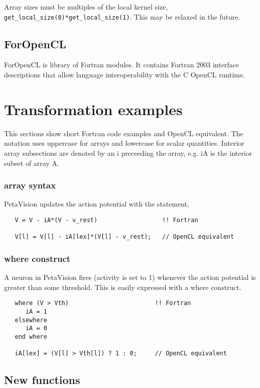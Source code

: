 \documentclass[10pt, conference, compsocconf]{IEEEtran}
\begin{document}
Array sizes must be multiples of the local kernel size,
{\tt get\_local\_size(0)*get\_local\_size(1)}.  This may be relaxed in the future.

\subsection{ForOpenCL}

ForOpenCL is library of Fortran modules.  It contains Fortran 2003 interface
descriptions that allow language interoperability with the C OpenCL runtime.

\section{Transformation examples}

This sections show short Fortran code examples and OpenCL equivalent.
The notation uses uppercase for arrays and lowercase for scalar quantities.
Interior array subsections are denoted by an i preceeding the array, e.g. iA
is the interior subset of array A.

\subsubsection{array syntax}

PetaVision updates the action potential with the statement,

\begin{verbatim}
   V = V - iA*(V - v_rest)                  !! Fortran

   V[l] = V[l] - iA[lex]*(V[l] - v_rest);   // OpenCL equivalent
\end{verbatim}

\subsubsection{where construct}

A neuron in PetaVision fires (activity is set to 1)
whenever the action potential is greater than some threshold.
This is easily expressed with a where construct.

\begin{verbatim}
   where (V > Vth)                        !! Fortran
      iA = 1
   elsewhere
      iA = 0
   end where

   iA[lex] = (V[l] > Vth[l]) ? 1 : 0;     // OpenCL equivalent
\end{verbatim}

\subsection{New functions}
\end{document}
